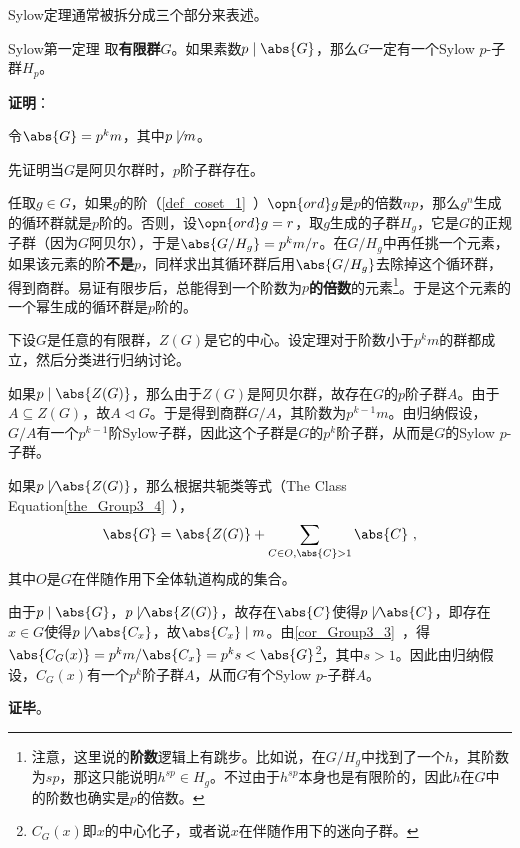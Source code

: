 Sylow定理通常被拆分成三个部分来表述。

\begin{theorem}{Sylow第一定理}
取\textbf{有限群}$G$。如果素数$p\mid\abs{G}$，那么$G$一定有一个Sylow $p$-子群$H_p$。
\end{theorem}

\textbf{证明}：

令$\abs{G}=p^km$，其中$p\not\mid m$。

先证明当$G$是阿贝尔群时，$p$阶子群存在。

任取$g\in G$，如果$g$的阶（\autoref{def_coset_1}~）$\opn{ord}g$是$p$的倍数$np$，那么$g^n$生成的循环群就是$p$阶的。否则，设$\opn{ord}g=r$，取$g$生成的子群$H_g$，它是$G$的正规子群（因为$G$阿贝尔），于是$\abs{G/H_g}=p^km/r$。在$G/H_g$中再任挑一个元素，如果该元素的阶\textbf{不是}$p$，同样求出其循环群后用$\abs{G/H_g}$去除掉这个循环群，得到商群。易证有限步后，总能得到一个阶数为$p$\textbf{的倍数}的元素\footnote{注意，这里说的\textbf{阶数}逻辑上有跳步。比如说，在$G/H_g$中找到了一个$h$，其阶数为$sp$，那这只能说明$h^{sp}\in H_g$。不过由于$h^{sp}$本身也是有限阶的，因此$h$在$G$中的阶数也确实是$p$的倍数。}。于是这个元素的一个幂生成的循环群是$p$阶的。

下设$G$是任意的有限群，$Z(G)$是它的中心。设定理对于阶数小于$p^km$的群都成立，然后分类进行归纳讨论。

如果$p\mid \abs{Z(G)}$，那么由于$Z(G)$是阿贝尔群，故存在$G$的$p$阶子群$A$。由于$A\subseteq Z(G)$，故$A\vartriangleleft G$。于是得到商群$G/A$，其阶数为$p^{k-1}m$。由归纳假设，$G/A$有一个$p^{k-1}$阶Sylow子群，因此这个子群是$G$的$p^k$阶子群，从而是$G$的Sylow $p$-子群。

如果$p\not\mid \abs{Z(G)}$，那么根据共轭类等式（The Class Equation\autoref{the_Group3_4}~），
\begin{equation}
\abs{G} = \abs{Z(G)} + \sum_{C\in O, \abs{C}>1} \abs{C}~,
\end{equation}
其中$O$是$G$在伴随作用下全体轨道构成的集合。

由于$p\mid \abs{G}$，$p\not\mid \abs{Z(G)}$，故存在$\abs{C}$使得$p\not\mid \abs{C}$，即存在$x\in G$使得$p\not\mid \abs{C_x}$，故$\abs{C_x}\mid m$。由\autoref{cor_Group3_3}~，得$\abs{C_G(x)}=p^km/\abs{C_x}=p^ks<\abs{G}$\footnote{$C_G(x)$即$x$的中心化子，或者说$x$在伴随作用下的迷向子群。}，其中$s>1$。因此由归纳假设，$C_G(x)$有一个$p^k$阶子群$A$，从而$G$有个Sylow $p$-子群$A$。

\textbf{证毕}。





